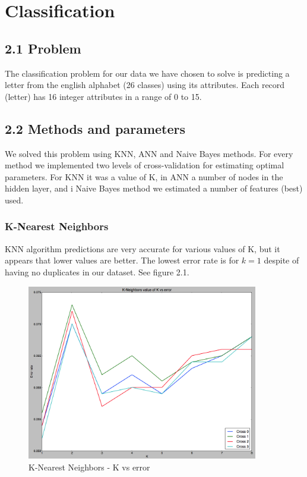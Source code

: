 \chapter*{Classification}
\setcounter{chapter}{2}
\setcounter{figure}{0}
\section*{2.1 Problem}
The classification problem for our data we have chosen to solve is predicting a letter
from the english alphabet (26 classes) using its attributes. Each record (letter) has 16 integer
attributes in a range of 0 to 15. 
\section*{2.2 Methods and parameters}
We solved this problem using KNN, ANN and Naive Bayes methods. For every method we implemented
two levels of cross-validation for estimating optimal parameters. For KNN it was a value of K, in ANN a number
of nodes in the hidden layer, and i Naive Bayes method we estimated a number of features (best) used. 
\subsection{K-Nearest Neighbors}
KNN algorithm predictions are very accurate for various values of K, but it appears that lower values are better.
The lowest error rate is for $k=1$ despite of having no duplicates in our dataset. See figure 2.1.
\begin{figure}[!tbh]
	\centering
	\includegraphics[width=0.9\textwidth]{figures/KN_kvalue}
	\caption{K-Nearest Neighbors - K vs error}
	\label{fig:KN_kvalue}
\end{figure}

